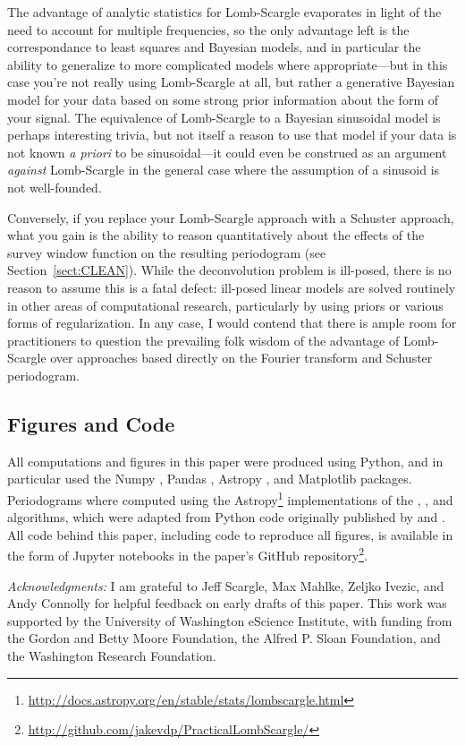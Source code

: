 \documentclass[preprint]{aastex}
\newcommand{\Sect}[1]{Section~\ref{sect:#1}}
\newcommand{\sect}[1]{\Sect{#1}}
\begin{document}
The advantage of analytic statistics for Lomb-Scargle evaporates in light of the
need to account for multiple frequencies, so the only advantage left is the
correspondance to least squares and Bayesian models, and in particular the
ability to generalize to more complicated models where appropriate---but in
this case you're not really using Lomb-Scargle at all,
but rather a generative Bayesian model for your
data based on some strong prior information about the form of your signal.
The equivalence of Lomb-Scargle to a Bayesian sinusoidal model is perhaps
interesting trivia, but not itself a reason to use that model if your data
is not known {\it a priori} to be sinusoidal---it could even be construed as
an argument {\it against} Lomb-Scargle in the general case where the assumption
of a sinusoid is not well-founded.

Conversely, if you replace your Lomb-Scargle approach with a Schuster approach,
what you gain is the ability to reason quantitatively about the effects of the
survey window function on the resulting periodogram (see \sect{CLEAN}).
While the deconvolution problem is ill-posed, there is no reason to assume
this is a fatal defect: ill-posed linear models are solved routinely in
other areas of computational research, particularly by using priors or
various forms of regularization.
In any case, I would contend that there is ample room for practitioners to
question the prevailing folk wisdom of the advantage of Lomb-Scargle
over approaches based directly on the Fourier transform and Schuster
periodogram.

\subsection{Figures and Code}

All computations and figures in this paper were produced using Python,
and in particular used the
Numpy \citep{numpy, numpybook},
Pandas \citep{pandas},
Astropy \citep{Astropy2013},
and Matplotlib \citep{matplotlib} packages.
Periodograms where computed using the
Astropy\footnote{\url{http://docs.astropy.org/en/stable/stats/lombscargle.html}}
implementations of the \citet{Press89}, \citet{Zechmeister09}, and
\citet{Palmer09} algorithms, which were adapted from Python code originally
published by \citet{ICVG2014} and \citet{VanderPlas2015}.
All code behind this paper, including code to reproduce all figures,
is available in the form of Jupyter notebooks in the paper's GitHub
repository\footnote{\url{http://github.com/jakevdp/PracticalLombScargle/}}.

\acknowledgments
{\it Acknowledgments:} I am grateful to Jeff Scargle, Max Mahlke,
Zeljko Ivezic, and Andy Connolly for helpful feedback on early drafts
of this paper.
This work was supported by the University of Washington eScience Institute,
with funding from the Gordon and Betty Moore Foundation, the Alfred P. Sloan
Foundation, and the Washington Research Foundation.



\end{document}
